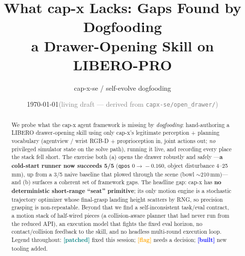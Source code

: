 \documentclass[11pt]{article}
\title{\textbf{What cap-x Lacks: Gaps Found by Dogfooding\\
a Drawer-Opening Skill on LIBERO-PRO}}
\author{cap-x-se / self-evolve dogfooding}
\date{\today \quad\textcolor{gray}{\small(living draft --- derived from
\texttt{capx-se/open\_drawer/})}}
\newcommand{\patched}{\textcolor{teal}{\textbf{[patched]}}}
\newcommand{\flag}{\textcolor{orange}{\textbf{[flag]}}}
\newcommand{\built}{\textcolor{blue}{\textbf{[built]}}}
\newcommand{\code}[1]{\texttt{#1}}
\begin{document}
\maketitle

\begin{abstract}
We probe what the cap-x agent framework is missing by \emph{dogfooding}: hand-authoring
a LIBERO drawer-opening skill using only cap-x's legitimate perception + planning
vocabulary (agentview / wrist RGB-D $+$ proprioception in, joint actions out; \emph{no}
privileged simulator state on the solve path), running it live, and recording every place
the stack fell short. The exercise both (a) opens the drawer robustly and safely
---\textbf{a cold-start runner now succeeds 5/5} (\code{qpos} $0\!\to\!-0.160$, object
disturbance 4--25\,mm), up from a 3/5 naive baseline that plowed through the scene
(bowl $\sim$210\,mm)---and (b) surfaces a coherent set of framework gaps. The headline
gap: cap-x has \textbf{no deterministic short-range ``seat'' primitive}; its only motion
engine is a stochastic trajectory optimizer whose final-grasp landing height scatters by
RNG, so precision grasping is non-repeatable. Beyond that we find a self-inconsistent
task/eval contract, a motion stack of half-wired pieces (a collision-aware planner that had
never run from the reduced API), an execution model that fights the fixed eval horizon, no
contact/collision feedback to the skill, and no headless multi-round execution loop. Legend
throughout: \patched{} fixed this session; \flag{} needs a decision; \built{} new tooling
added.
\end{abstract}
\end{document}
